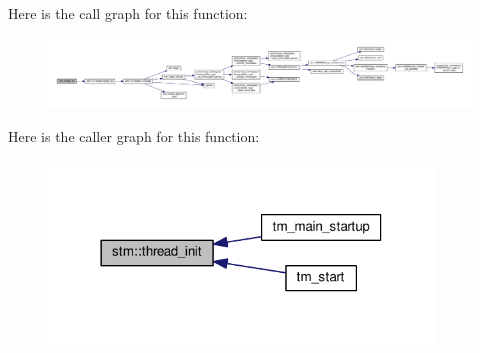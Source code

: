 Here is the call graph for this function\-:
\nopagebreak
\begin{figure}[H]
\begin{center}
\leavevmode
\includegraphics[width=350pt]{namespacestm_a3de69c665250e84ef5238477ae8524b0_cgraph}
\end{center}
\end{figure}




Here is the caller graph for this function\-:
\nopagebreak
\begin{figure}[H]
\begin{center}
\leavevmode
\includegraphics[width=290pt]{namespacestm_a3de69c665250e84ef5238477ae8524b0_icgraph}
\end{center}
\end{figure}


